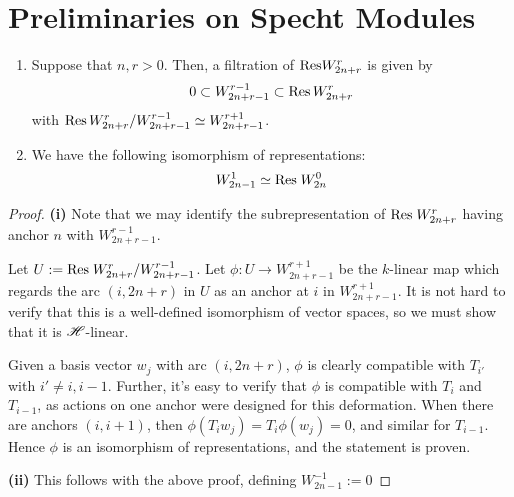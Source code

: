 \documentclass{amsart}
\begin{document}
\newpage
\section{Preliminaries on Specht Modules}
\begin{proposition}
  \begin{enumerate}[label={(\roman*)}]
    \item
    Suppose that $n,r > 0$.
    Then, a filtration of $\text{Res} W_{2n + r}^r$ is given by
    \begin{equation}
      0 \subset W_{2n + r - 1}^{r-1} \subset \text{Res} \, W_{2n + r}^r \label{Filtration}
     \end{equation}
     with $\text{Res} \, W_{2n + r}^r / W_{2n + r - 1}^{r-1} \simeq W_{2n + r - 1}^{r + 1}$. 
    \item
      We have the following isomorphism of representations:
      \begin{equation}
        W_{2n - 1}^1 \simeq \text{Res} \; W_{2n}^0 \label{0 Restriction}
       \end{equation}
  \end{enumerate}
\end{proposition}
\begin{proof}
  \textbf{(i)}
  Note that we may identify the subrepresentation of $\text{Res} \; W_{2n + r}^r$ having anchor $n$ with $W_{2n + r - 1}^{r-1}$.
  
  Let $U := \text{Res} \; W_{2n + r}^r / W_{2n + r - 1}^{r - 1}$. 
  Let $\phi:U \rightarrow W_{2n + r - 1}^{r + 1}$ be the $k$-linear map which regards the arc $(i,2n + r)$ in $U$ as an anchor at $i$ in $W_{2n + r - 1}^{r + 1}$.
  It is not hard to verify that this is a well-defined isomorphism of vector spaces, so we must show that it is $\mathscr{H}$-linear.

  Given a basis vector $w_j$ with arc $(i,2n + r)$, $\phi$ is clearly compatible with $T_{i'}$ with $i' \neq i,i-1$.
  Further, it's easy to verify that $\phi$ is compatible with $T_{i}$ and $T_{i-1}$, as actions on one anchor were designed for this deformation.
  When there are anchors $(i,i+1)$, then $\phi(T_iw_j) = T_i\phi(w_j) = 0$, and similar for $T_{i -1}$.
  Hence $\phi$ is an isomorphism of representations, and the statement is proven.

  \textbf{(ii)}
  This follows with the above proof, defining $W_{2n - 1}^{-1} := 0$
\end{proof}
\end{document}

